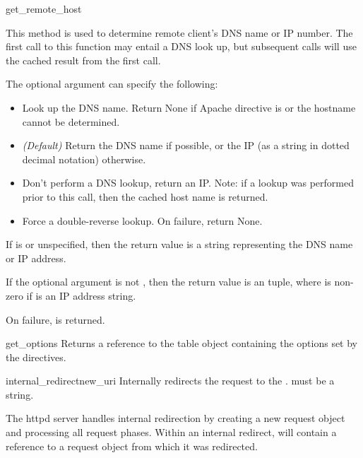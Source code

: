 \begin{methoddesc}[request]{get_remote_host}{}

  This method is used to determine remote client's DNS name or IP
  number. The first call to this function may entail a DNS look up, but
  subsequent calls will use the cached result from the first call.

  The optional  argument can specify the following: 

  \begin{itemize}

  \item
     Look up the DNS name. Return None if Apache
    directive  is  or the hostname cannot
    be determined.

  \item                  
     \emph{(Default)} Return the DNS name if
    possible, or the IP (as a string in dotted decimal notation)
    otherwise.

  \item
     Don't perform a DNS lookup, return an
    IP. Note: if a lookup was performed prior to this call, then the
    cached host name is returned.

  \item
     Force a double-reverse lookup. On 
    failure, return None.

  \end{itemize}

  If  is  or unspecified, then the return
  value is a string representing the DNS name or IP address.

  If the optional  argument is not , then the
  return value is an  tuple, where 
  is non-zero if  is an IP address string.

  On failure,  is returned.

\end{methoddesc}

\begin{methoddesc}[request]{get_options}{}
  Returns a reference to the table object containing the options set by
  the  directives.
\end{methoddesc}

\begin{methoddesc}[request]{internal_redirect}{new_uri}
  Internally redirects the request to the . 
  must be a string.

  The httpd server handles internal redirection by creating a new
  request object and processing all request phases. Within an internal
  redirect,  will contain a reference to a request
  object from which it was redirected.

\end{methoddesc}

